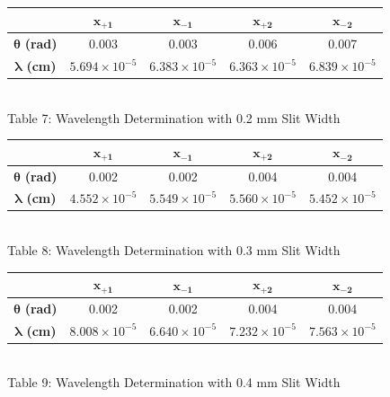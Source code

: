 \begin{center}
    \vspace{6mm} 
    \centering
    \begin{tabular}{|c|c|c|c|c|}
        \hline
        & $\bm{x_{+1}}$ &$\bm{x_{-1}}$ & $\bm{x_{+2}}$ & $\bm{x_{-2}}$  \\ \hline
        $\bm{\theta}$ \textbf{(rad)} & 0.003 & 0.003 & 0.006 & 0.007 \\
        $\bm{\lambda}$ \textbf{(cm)} & $5.694\times10^{-5}$ & $6.383\times10^{-5}$ & $6.363\times10^{-5}$ & $6.839\times10^{-5}$ \\ \hline
    \end{tabular} 
    \vspace{3mm}
    \\ Table 7: Wavelength Determination with 0.2 mm Slit Width\\
    \vspace{5mm}
    \centering
    \begin{tabular}{|c|c|c|c|c|}
        \hline
        & $\bm{x_{+1}}$ &$\bm{x_{-1}}$ & $\bm{x_{+2}}$ & $\bm{x_{-2}}$  \\ \hline
        $\bm{\theta}$ \textbf{(rad)} & 0.002 & 0.002 & 0.004 & 0.004 \\
        $\bm{\lambda}$ \textbf{(cm)} & $4.552\times10^{-5}$ & $5.549\times10^{-5}$ & $5.560\times10^{-5}$ & $5.452\times10^{-5}$ \\ \hline
    \end{tabular} 
    \vspace{3mm}
    \\ Table 8: Wavelength Determination with 0.3 mm Slit Width\\
    \vspace{5mm}
    \begin{tabular}{|c|c|c|c|c|}
        \hline
        & $\bm{x_{+1}}$ &$\bm{x_{-1}}$ & $\bm{x_{+2}}$ & $\bm{x_{-2}}$  \\ \hline
        $\bm{\theta}$ \textbf{(rad)} & 0.002 & 0.002 & 0.004 & 0.004 \\
        $\bm{\lambda}$ \textbf{(cm)} & $8.008\times10^{-5}$ & $6.640\times10^{-5}$ & $7.232\times10^{-5}$ & $7.563\times10^{-5}$ \\ \hline
    \end{tabular} 
    \vspace{3mm}
    \\ Table 9: Wavelength Determination with 0.4 mm Slit Width\\
    \vspace{5mm}

\end{center}
